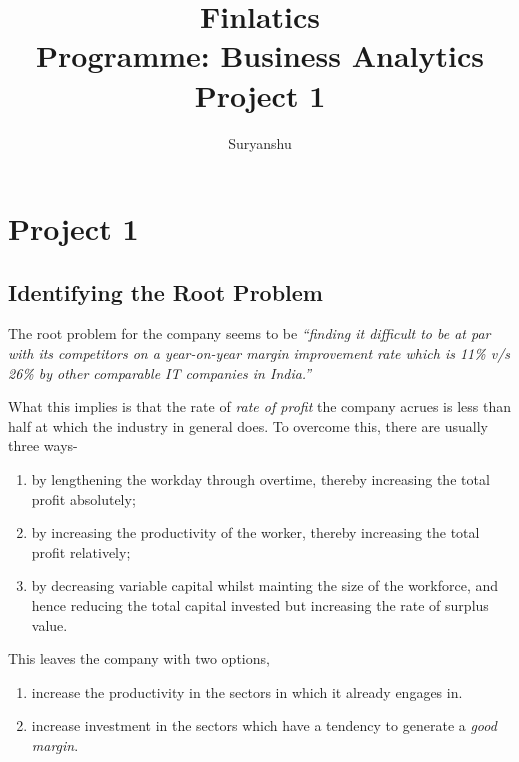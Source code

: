 \documentclass{report}
\title{\textbf{Finlatics \\ Programme: Business Analytics \\ Project 1}}
\author{Suryanshu}
\begin{document}
\maketitle
\tableofcontents

\chapter{Project 1 }
\section{Identifying the Root Problem}
The root problem for the company seems to be \emph{``finding it difficult to be at par with its competitors on a year-on-year margin improvement rate which is 11\% v/s 26\% by other comparable IT companies in India.''}

What this implies is that the rate of \emph{rate of profit} the company acrues is less than half at which the industry in general does. To overcome this, there are usually three ways- 
\begin{enumerate}
    \item by lengthening the workday through overtime, thereby increasing the total profit absolutely; 
    \item by increasing the productivity of the worker, thereby increasing the total profit relatively;
    \item by decreasing variable capital whilst mainting the size of the workforce, and hence reducing the total capital invested but increasing the rate of surplus value.
\end{enumerate}
This leaves the company with two options,
\begin{enumerate}
    \item increase the productivity in the sectors in which it already engages in.
    \item increase investment in the sectors which have a tendency to generate a \emph{good margin}.
\end{enumerate}
\newpage
\end{document}

